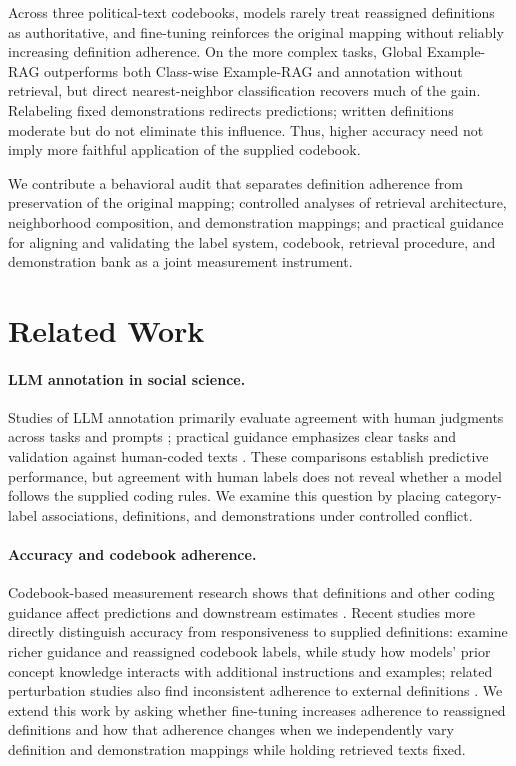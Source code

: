 \documentclass[11pt]{article}
\begin{document}
Across three political-text codebooks, models rarely treat reassigned definitions as authoritative, and fine-tuning reinforces the original mapping without reliably increasing definition adherence. On the more complex tasks, Global Example-RAG outperforms both Class-wise Example-RAG and annotation without retrieval, but direct nearest-neighbor classification recovers much of the gain. Relabeling fixed demonstrations redirects predictions; written definitions moderate but do not eliminate this influence. Thus, higher accuracy need not imply more faithful application of the supplied codebook.

We contribute a behavioral audit that separates definition adherence from preservation of the original mapping; controlled analyses of retrieval architecture, neighborhood composition, and demonstration mappings; and practical guidance for aligning and validating the label system, codebook, retrieval procedure, and demonstration bank as a joint measurement instrument.

\section{Related Work}
\label{sec:related}

\paragraph{LLM annotation in social science.}
Studies of LLM annotation primarily evaluate agreement with human judgments across tasks and prompts \citep{gilardi2023chatgpt,ziems2024can,pangakis2023automated,abraham2025prompt}; practical guidance emphasizes clear tasks and validation against human-coded texts \citep{tornberg2024best,alizadeh2025}. These comparisons establish predictive performance, but agreement with human labels does not reveal whether a model follows the supplied coding rules. We examine this question by placing category-label associations, definitions, and demonstrations under controlled conflict.

\paragraph{Accuracy and codebook adherence.}
Codebook-based measurement research shows that definitions and other coding guidance affect predictions and downstream estimates \citep{halterman2026codebook,halterman2026protest}. Recent studies more directly distinguish accuracy from responsiveness to supplied definitions: \citet{he2026} examine richer guidance and reassigned codebook labels, while \citet{casanova2026} study how models' prior concept knowledge interacts with additional instructions and examples; related perturbation studies also find inconsistent adherence to external definitions \citep{mohammadi2025llms}. We extend this work by asking whether fine-tuning increases adherence to reassigned definitions and how that adherence changes when we independently vary definition and demonstration mappings while holding retrieved texts fixed.
\end{document}
